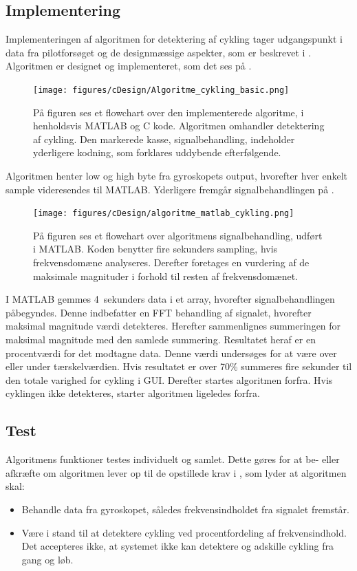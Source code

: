 \subsection{Implementering}
Implementeringen af algoritmen for detektering af cykling tager udgangspunkt i data fra pilotforsøget og de designmæssige aspekter, som er beskrevet i . Algoritmen er designet og implementeret, som det ses på .
\begin{figure}[H]
	\centering
	\texttt{[image: figures/cDesign/Algoritme\_cykling\_basic.png]}
	\caption{På figuren ses et flowchart over den implementerede algoritme, i henholdsvis MATLAB og C kode. Algoritmen omhandler detektering af cykling. Den markerede kasse, signalbehandling, indeholder yderligere kodning, som forklares uddybende efterfølgende.}
	\label{fig:basic_cykling}
\end{figure}\vspace{-0.25cm}
Algoritmen henter low og high byte fra gyroskopets output, hvorefter hver enkelt sample videresendes til MATLAB. Yderligere fremgår signalbehandlingen på .
\begin{figure}[H]
	\centering
	\texttt{[image: figures/cDesign/algoritme\_matlab\_cykling.png]}
	\caption{På figuren ses et flowchart over algoritmens signalbehandling, udført i MATLAB. Koden benytter fire sekunders sampling, hvis frekvensdomæne analyseres. Derefter foretages en vurdering af de maksimale magnituder i forhold til resten af frekvensdomænet.}
	\label{fig:matlab_cykling}
\end{figure}\vspace{-0.25cm}
I MATLAB gemmes 4~sekunders data i et array, hvorefter signalbehandlingen påbegyndes. Denne indbefatter en FFT behandling af signalet, hvorefter maksimal magnitude værdi detekteres. Herefter sammenlignes summeringen for maksimal magnitude med den samlede summering. Resultatet heraf er en procentværdi for det modtagne data. Denne værdi undersøges for at være over eller under tærskelværdien. Hvis resultatet er over 70\% summeres fire sekunder til den totale varighed for cykling i GUI. Derefter startes algoritmen forfra. Hvis cyklingen ikke detekteres, starter algoritmen ligeledes forfra. 

\subsection{Test}
Algoritmens funktioner testes individuelt og samlet. Dette gøres for at be- eller afkræfte om algoritmen lever op til de opstillede krav i , som lyder at algoritmen skal:
\begin{itemize}
	\item Behandle data fra gyroskopet, således frekvensindholdet fra signalet fremstår.
	\item Være i stand til at detektere cykling ved procentfordeling af frekvensindhold. Det accepteres ikke, at systemet ikke kan detektere og adskille cykling fra gang og løb.
\end{itemize}

